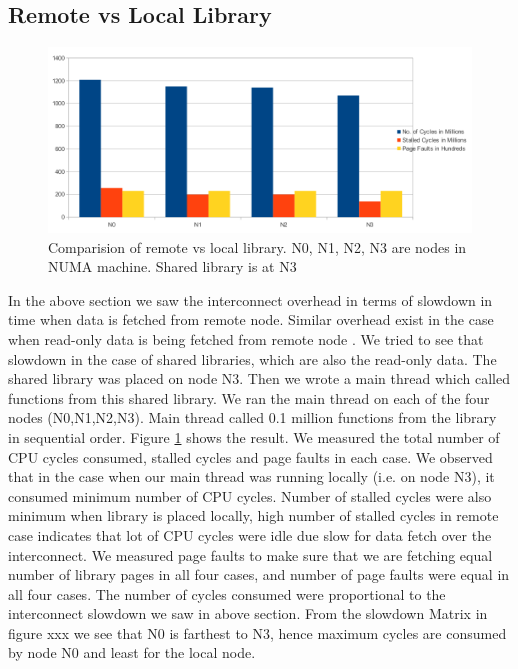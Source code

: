 \subsection{Remote vs Local Library} \label{sec:remoteVsLocal}

\begin{figure}
    \centering
    \includegraphics[scale=0.35]{remoteVsLocal.png}
    \caption{Comparision of remote vs local library. N0, N1, N2, N3 are nodes in NUMA machine. Shared library is at N3 }
    \label{fig:remoteVsLocal}
\end{figure}


In the above section we saw the interconnect overhead in terms of slowdown in time when data is fetched from remote node.
Similar overhead exist in the case when read-only data is being fetched from remote node \cite{Drepper07whatevery}.
We tried to see that slowdown in the case of shared libraries, which are also the read-only data.
The shared library was placed on node N3.
Then we wrote a main thread which called functions from this shared library.
We ran the main thread on each of the four nodes (N0,N1,N2,N3).
Main thread called 0.1 million functions from the library in sequential order.
Figure \ref{fig:remoteVsLocal} shows the result.
We measured the total number of CPU cycles consumed, stalled cycles and page faults in each case.
We observed that in the case when our main thread was running locally (i.e. on node N3), it consumed minimum number of CPU cycles.
Number of stalled cycles were also minimum when library is placed locally, high number of stalled cycles in remote case indicates that lot of CPU cycles were idle due slow for data fetch over the interconnect.
We measured page faults to make sure that we are fetching equal number of library pages in all four cases, and number of page faults were equal in all four cases.
The number of cycles consumed were proportional to the interconnect slowdown we saw in above section.
From the slowdown Matrix in figure xxx we see that N0 is farthest to N3, hence maximum cycles are consumed by node N0 and least for the local node.



